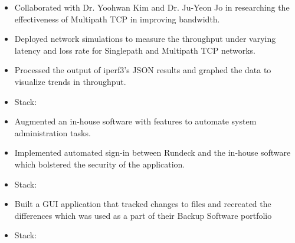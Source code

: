 

\begin{itemize}
    \item Collaborated with Dr. Yoohwan Kim and Dr. Ju-Yeon Jo in researching the effectiveness of Multipath TCP in improving bandwidth.
    \item Deployed network simulations to measure the throughput under varying latency and loss rate for Singlepath and Multipath TCP networks.
    \item Processed the output of iperf3's JSON results and graphed the data to visualize trends in throughput.
    \item Stack:    
\end{itemize}
\divider

\begin{itemize}
    \item Augmented an in-house software with features to automate system administration tasks.
    \item Implemented automated sign-in between Rundeck and the in-house software which bolstered the security of the application.
    \item Stack:  
\end{itemize}

\divider

\begin{itemize}
    \item Built a GUI application that tracked changes to files and recreated the differences which was used as a part of their Backup Software portfolio 
    \item Stack:   
\end{itemize}

\divider

